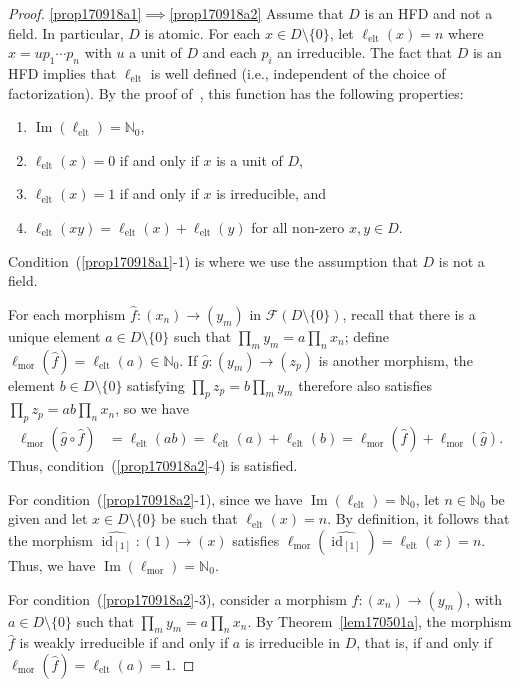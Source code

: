 \documentclass[reqno]{amsart}
\theoremstyle{plain}
\theoremstyle{definition}
\newcommand{\cat}[1]{\mathcal{#1}}
\newcommand{\catf}{\cat{F}}
\newcommand{\id}{\operatorname{id}}
\newcommand{\im}{\operatorname{Im}}
\newcommand{\bbn}{\mathbb{N}}
\numberwithin{equation}{lem}
\newcommand{\zaks}[1]{\ell_{\text{#1}}}
\newcommand{\zaksmor}{\zaks{mor}}
\newcommand{\zakselt}{\zaks{elt}}
\begin{document}
\begin{proof}
\eqref{prop170918a1}$\implies$\eqref{prop170918a2}
Assume that $D$ is an HFD and not a field. 
In particular, $D$ is atomic.
For each $x\in D\setminus\{0\}$, 
let $\zakselt(x)=n$ where $x=up_1\cdots p_n$ with $u$ a unit of $D$ and each $p_i$ an irreducible.
The fact that $D$ is an HFD implies that $\zakselt$ is well defined (i.e., independent of the choice of factorization).
By the proof of~\cite[Lemma~1.3]{zaks}, this function has the following properties:
\begin{enumerate}
\item $\im(\zakselt)=\bbn_0$,
\item $\zakselt(x)=0$ if and only if $x$ is a unit of $D$, 
\item $\zakselt(x)=1$ if and only if $x$ is irreducible, and
\item $\zakselt(xy)=\zakselt(x)+\zakselt(y)$ for all non-zero $x,y\in D$.
\end{enumerate}
Condition~(\ref{prop170918a1}-1) is where we use the assumption that $D$ is not a field.

For each morphism $\hat f\colon(x_n)\to(y_m)$ 
in
$\catf(D\setminus\{0\})$,
recall that there is a unique element $a\in D\setminus\{0\}$ such that $\prod_my_m=a\prod_nx_n$;
define $\zaksmor(\hat f)=\zakselt(a)\in\bbn_0$.
If $\hat g\colon(y_m)\to(z_p)$ is another 
morphism,
the element $b\in D\setminus\{0\}$
satisfying $\prod_pz_p=b\prod_my_m$ therefore also satisfies $\prod_pz_p=ab\prod_nx_n$,
so we have
\begin{align*}
\zaksmor(\hat g\circ\hat f)
&=\zakselt(ab)
=\zakselt(a)+\zakselt(b)
=\zaksmor(\hat f)+\zaksmor(\hat g).
\end{align*}
Thus, condition~(\ref{prop170918a2}-4) is satisfied.

For condition~(\ref{prop170918a2}-1),
since we have
$\im(\zakselt)=\bbn_0$, let $n\in \bbn_0$ be given and let $x\in D\setminus\{0\}$ be such that
$\zakselt(x)=n$. By definition, it follows that the morphism $\widehat{\id_{[1]}}\colon(1)\to(x)$ satisfies
$\zaksmor(\widehat{\id_{[1]}})=\zakselt(x)=n$. Thus, we have $\im(\zaksmor)=\bbn_0$.

For condition~(\ref{prop170918a2}-3), consider a morphism $\hat f\colon(x_n)\to(y_m)$, with 
$a\in D\setminus\{0\}$ such that $\prod_my_m=a\prod_nx_n$.
By 
Theorem~\ref{lem170501a},
the morphism $\hat f$ is weakly irreducible if and only if $a$ is irreducible in $D$,
that is, if and only if $\zaksmor(\hat f)=\zakselt(a)=1$.


\end{proof}
\end{document}
